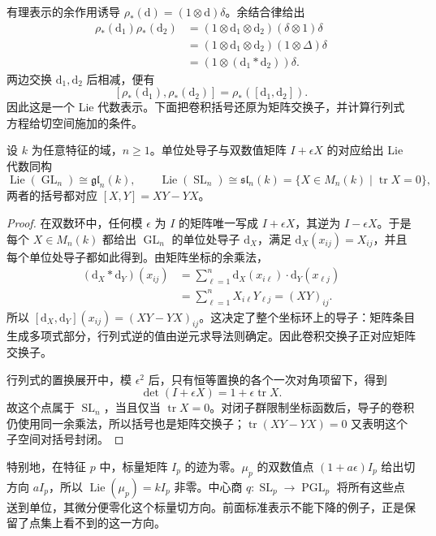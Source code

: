 \ProseParagraphBreak
有理表示的余作用诱导 \(\rho_*(\mathrm{d})=(1\otimes\mathrm{d})\delta\)。余结合律给出
\[
	\begin{aligned}
		\rho_*(\mathrm{d}_1)\rho_*(\mathrm{d}_2) &=(1\otimes\mathrm{d}_1\otimes\mathrm{d}_2)(\delta\otimes1)\delta\\
		&=(1\otimes\mathrm{d}_1\otimes\mathrm{d}_2)(1\otimes\Delta)\delta\\
		&=(1\otimes(\mathrm{d}_1*\mathrm{d}_2))\delta.
	\end{aligned}
\]
两边交换 \(\mathrm{d}_1,\mathrm{d}_2\) 后相减，便有
\[
	[\rho_*(\mathrm{d}_1),\rho_*(\mathrm{d}_2)]=\rho_*([\mathrm{d}_1,\mathrm{d}_2]).
\]
因此这是一个 Lie 代数表示。下面把卷积括号还原为矩阵交换子，并计算行列式方程给切空间施加的条件。
\begin{proposition}\label{b5:prop:matrix-group-lie-bracket}
	设 \(k\) 为任意特征的域，\(n\ge1\)。单位处导子与双数值矩阵 \(I+\epsilon X\) 的对应给出 Lie 代数同构
	\[
		\operatorname{Lie}(\operatorname{GL}_n)\cong\mathfrak{gl}_n(k),\qquad \operatorname{Lie}(\operatorname{SL}_n)\cong\mathfrak{sl}_n(k) =\{X\in M_n(k)\mid\operatorname{tr}X=0\},
	\]
	两者的括号都对应 \([X,Y]=XY-YX\)。
\end{proposition}
\begin{proof}
	在双数环中，任何模 \(\epsilon\) 为 \(I\) 的矩阵唯一写成 \(I+\epsilon X\)，其逆为 \(I-\epsilon X\)。于是每个 \(X\in M_n(k)\) 都给出 \(\operatorname{GL}_n\) 的单位处导子 \(\mathrm{d}_X\)，满足 \(\mathrm{d}_X(x_{ij})=X_{ij}\)，并且每个单位处导子都如此得到。由矩阵坐标的余乘法，
	\[
		\begin{aligned}
			(\mathrm{d}_X*\mathrm{d}_Y)(x_{ij}) &=\sum_{\ell=1}^n\mathrm{d}_X(x_{i\ell})\cdot\mathrm{d}_Y(x_{\ell j})\\
			&=\sum_{\ell=1}^n X_{i\ell}Y_{\ell j}=(XY)_{ij}.
		\end{aligned}
	\]
	所以 \([\mathrm{d}_X,\mathrm{d}_Y](x_{ij})=(XY-YX)_{ij}\)。这决定了整个坐标环上的导子：矩阵条目生成多项式部分，行列式逆的值由逆元求导法则确定。因此卷积交换子正对应矩阵交换子。

	行列式的置换展开中，模 \(\epsilon^2\) 后，只有恒等置换的各个一次对角项留下，得到
	\[
		\det(I+\epsilon X)=1+\epsilon\operatorname{tr}X.
	\]
	故这个点属于 \(\operatorname{SL}_n\)，当且仅当 \(\operatorname{tr}X=0\)。对闭子群限制坐标函数后，导子的卷积仍使用同一余乘法，所以括号也是矩阵交换子；\(\operatorname{tr}(XY-YX)=0\) 又表明这个子空间对括号封闭。
\end{proof}
特别地，在特征 \(p\) 中，标量矩阵 \(I_p\) 的迹为零。\(\mu_p\) 的双数值点 \((1+a\epsilon)I_p\) 给出切方向 \(aI_p\)，所以 \(\operatorname{Lie}(\mu_p)=kI_p\) 非零。中心商 \(q:\operatorname{SL}_p\to\operatorname{PGL}_p\) 将所有这些点送到单位，其微分便零化这个标量切方向。前面标准表示不能下降的例子，正是保留了点集上看不到的这一方向。
